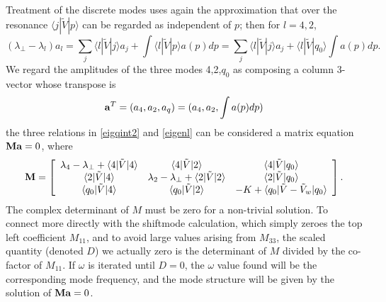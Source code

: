 \documentclass{jpp}
\def\ket#1{|#1\rangle}
\def\bra#1{\langle#1}
\def\a{{\bf a}}
\def\M{{\bf M}}
\begin{document}
Treatment of the discrete modes uses again the approximation that
over the resonance $\bra{j}|\tilde V\ket{p}$ can be regarded as
independent of $p$; then for $l=4,2$,
\begin{equation}
  \label{eigenl}
  (\lambda_\perp-\lambda_l)a_l=\sum_j\bra{l}|\tilde{V}\ket{j}a_j
  +\int\bra{l}|\tilde{V}\ket{p}a(p)dp
  =\sum_j\bra{l}|\tilde{V}\ket{j}a_j
  +\bra{l}|\tilde{V}\ket{q_0}\int a(p)dp.
\end{equation}
We regard the amplitudes of the three modes 4,2,$q_0$ as composing a
column 3-vector whose transpose is
\begin{equation}
  \label{avector}
  \a^T=(a_4,a_2,a_q)=(a_4,a_2,\int a(p)dp)
\end{equation}
the three relations in \ref{eigqint2} and \ref{eigenl} can be
considered a matrix equation $\M\a=0$, where
\begin{equation}
  \label{aveq}
  \M=\left[
  \begin{array}{ccc}
    \lambda_4-\lambda_\perp+\bra{4}|\tilde V\ket{4}
    &\bra{4}|\tilde V\ket{2}&\bra{4}|\tilde V\ket{q_0}\\
    \bra{2}|\tilde V\ket{4}
    &\lambda_2-\lambda_\perp+\bra{2}|\tilde
      V\ket{2}&\bra{2}|\tilde V\ket{q_0}\\
    \bra{q_0}|\tilde V\ket{4}
    &\bra{q_0}|\tilde V\ket{2}&-K+\bra{q_0}|\tilde V-\tilde V_w\ket{q_0}
  \end{array}\right]
\iffalse
\left[
  \begin{array}{c}
    a_4\\
    a_2\\
    \int a(p)dp
  \end{array}\right]=0.
\fi.
\end{equation}
The complex determinant of $M$ must be zero for a non-trivial
solution. To connect more directly with the shiftmode calculation,
which simply zeroes the top left coefficient $M_{11}$, and to avoid large values
arising from $M_{33}$,  the scaled quantity (denoted $D$) we actually zero
is the determinant of $M$ divided by the co-factor of $M_{11}$. If
$\omega$ is iterated until $D=0$, the $\omega$ value found will be the
corresponding mode frequency, and the mode structure will be given by
the solution of $\M\a=0$.

\iffalse
Note\footnote{
The ordered perturbative approximations found in prior sections correspond,
in this formulation, to neglecting $\bra{2}|\tilde V\ket{q_0}$,
$\bra{q_0}|\tilde V\ket{2}$ and $\bra{2}|\tilde V\ket{2}$; then
determining $a_2/a_4$ from the second row, and $\int a(p)dp/a_4$ from the third
row.}\fi
\end{document}

